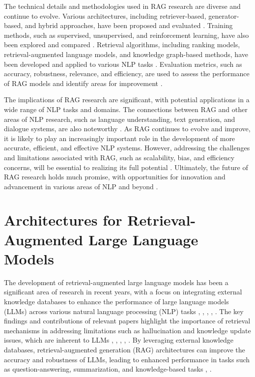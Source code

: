 \documentclass[conference]{IEEEtran}
\begin{document}
The technical details and methodologies used in RAG research are diverse and continue to evolve. Various architectures, including retriever-based, generator-based, and hybrid approaches, have been proposed and evaluated \cite{b12}. Training methods, such as supervised, unsupervised, and reinforcement learning, have also been explored and compared \cite{b13}. Retrieval algorithms, including ranking models, retrieval-augmented language models, and knowledge graph-based methods, have been developed and applied to various NLP tasks \cite{b14}. Evaluation metrics, such as accuracy, robustness, relevance, and efficiency, are used to assess the performance of RAG models and identify areas for improvement \cite{b15}.

The implications of RAG research are significant, with potential applications in a wide range of NLP tasks and domains. The connections between RAG and other areas of NLP research, such as language understanding, text generation, and dialogue systems, are also noteworthy \cite{b16}. As RAG continues to evolve and improve, it is likely to play an increasingly important role in the development of more accurate, efficient, and effective NLP systems. However, addressing the challenges and limitations associated with RAG, such as scalability, bias, and efficiency concerns, will be essential to realizing its full potential \cite{b17}. Ultimately, the future of RAG research holds much promise, with opportunities for innovation and advancement in various areas of NLP and beyond \cite{b18}.

\section{Architectures for Retrieval-Augmented Large Language Models}
The development of retrieval-augmented large language models has been a significant area of research in recent years, with a focus on integrating external knowledge databases to enhance the performance of large language models (LLMs) across various natural language processing (NLP) tasks \cite{b1}, \cite{b2}, \cite{b3}, \cite{b4}, \cite{b5}. The key findings and contributions of relevant papers highlight the importance of retrieval mechanisms in addressing limitations such as hallucination and knowledge update issues, which are inherent to LLMs \cite{b1}, \cite{b2}, \cite{b3}, \cite{b4}, \cite{b5}. By leveraging external knowledge databases, retrieval-augmented generation (RAG) architectures can improve the accuracy and robustness of LLMs, leading to enhanced performance in tasks such as question-answering, summarization, and knowledge-based tasks \cite{b2}, \cite{b4}.
\end{document}
